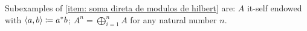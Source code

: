 \begin{exemplos}
\begin{itroman}
    \item Subexamples of \ref{item: soma direta de modulos de hilbert} are: $A$ it-self endowed with $\langle {a},{b}\rangle \coloneqq a^*b$; $A^n = \bigoplus_{i =1}^n A$ for any natural number $n$.
    

\end{itroman}
\end{exemplos}
